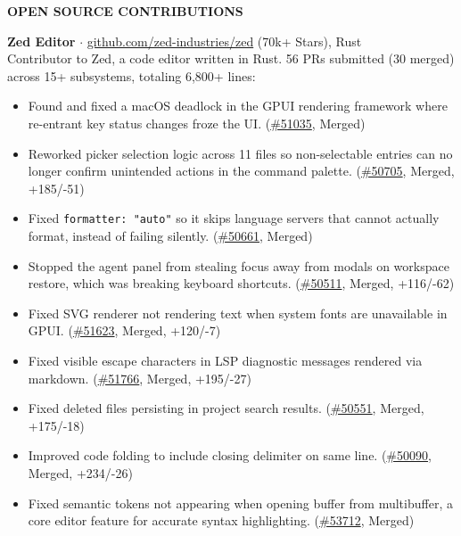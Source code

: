 \documentclass[10pt,a4paper]{article}
\newcommand{\cvsection}[1]{%
    \vspace{8pt}%
    {\large\bfseries\uppercase{#1}}\\[2pt]%
    \vspace{2pt}%
}
\begin{document}
\cvsection{Open Source Contributions}

\noindent\textbf{\footnotesize Zed Editor} {\footnotesize $\cdot$ \href{https://github.com/zed-industries/zed}{github.com/zed-industries/zed} (70k+ Stars), Rust}\\
{\footnotesize Contributor to Zed, a code editor written in Rust. 56 PRs submitted (30 merged) across 15+ subsystems, totaling 6,800+ lines:}
\begin{itemize}
    \item {\footnotesize Found and fixed a macOS deadlock in the GPUI rendering framework where re-entrant key status changes froze the UI. (\href{https://github.com/zed-industries/zed/pull/51035}{\#51035}, Merged)}
    \item {\footnotesize Reworked picker selection logic across 11 files so non-selectable entries can no longer confirm unintended actions in the command palette. (\href{https://github.com/zed-industries/zed/pull/50705}{\#50705}, Merged, +185/-51)}
    \item {\footnotesize Fixed \texttt{formatter: "auto"} so it skips language servers that cannot actually format, instead of failing silently. (\href{https://github.com/zed-industries/zed/pull/50661}{\#50661}, Merged)}
    \item {\footnotesize Stopped the agent panel from stealing focus away from modals on workspace restore, which was breaking keyboard shortcuts. (\href{https://github.com/zed-industries/zed/pull/50511}{\#50511}, Merged, +116/-62)}
    \item {\footnotesize Fixed SVG renderer not rendering text when system fonts are unavailable in GPUI. (\href{https://github.com/zed-industries/zed/pull/51623}{\#51623}, Merged, +120/-7)}
    \item {\footnotesize Fixed visible escape characters in LSP diagnostic messages rendered via markdown. (\href{https://github.com/zed-industries/zed/pull/51766}{\#51766}, Merged, +195/-27)}
    \item {\footnotesize Fixed deleted files persisting in project search results. (\href{https://github.com/zed-industries/zed/pull/50551}{\#50551}, Merged, +175/-18)}
    \item {\footnotesize Improved code folding to include closing delimiter on same line. (\href{https://github.com/zed-industries/zed/pull/50090}{\#50090}, Merged, +234/-26)}
    \item {\footnotesize Fixed semantic tokens not appearing when opening buffer from multibuffer, a core editor feature for accurate syntax highlighting. (\href{https://github.com/zed-industries/zed/pull/53712}{\#53712}, Merged)}

\end{itemize}
\end{document}

